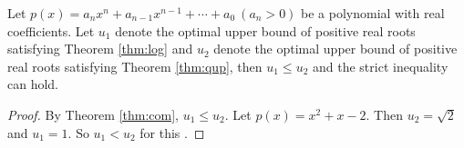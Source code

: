 \begin{theorem}\label{thm:com1}
	
	Let $p(x)=a_nx^n+a_{n-1}x^{n-1}+\cdots+a_0\ (a_n>0)$ be a polynomial with real coefficients. Let  $u_1$ denote the optimal upper bound of
	positive real roots satisfying Theorem \ref{thm:log} and $u_2$ denote the optimal upper bound of positive real roots satisfying Theorem \ref{thm:qup}, then $u_1\le u_2$ and the  strict inequality can hold.
\end{theorem}

\begin{proof}
	By Theorem \ref{thm:com}, $u_1\le u_2$.
	Let $p(x)=x^2+x-2$. Then $u_2=\sqrt{2}$ and $u_1=1$. So
	$u_1<u_2$ for this .
\end{proof}

